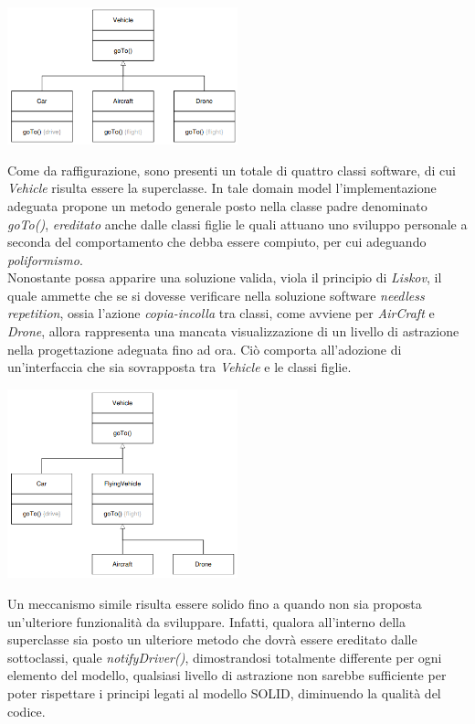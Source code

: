 \documentclass{article}
\begin{document}
\begin{center}
    \includegraphics*[width=0.5\textwidth]{foto 1.png}
\end{center}\vspace*{7pt}
Come da raffigurazione, sono presenti un totale di quattro classi software, di cui \textit{Vehicle} risulta essere la superclasse. In tale domain model l'implementazione adeguata propone un metodo generale posto nella classe padre denominato \textit{goTo()}, \textit{ereditato} anche dalle classi figlie le quali attuano uno sviluppo personale a seconda del comportamento che debba essere compiuto, per cui adeguando \textit{poliformismo}.\vspace*{7pt}\\
Nonostante possa apparire una soluzione valida, viola il principio di \textit{Liskov}, il quale ammette che se si dovesse verificare nella soluzione software \textit{needless repetition}, ossia l'azione \textit{copia-incolla} tra classi, come avviene per \textit{AirCraft} e \textit{Drone}, allora rappresenta una mancata visualizzazione di un livello di astrazione nella progettazione adeguata fino ad ora. Ciò comporta all'adozione di un'interfaccia che sia sovrapposta tra \textit{Vehicle} e le classi figlie. 
\begin{center}
    \includegraphics*[width=0.5\textwidth]{foto 2.png}
\end{center}
Un meccanismo simile risulta essere solido fino a quando non sia proposta un'ulteriore funzionalità da sviluppare. Infatti, qualora all'interno della superclasse sia posto un ulteriore metodo che dovrà essere ereditato dalle sottoclassi, quale \textit{notifyDriver()}, dimostrandosi totalmente differente per ogni elemento del modello, qualsiasi livello di astrazione non sarebbe sufficiente per poter rispettare i principi legati al modello SOLID, diminuendo la qualità del codice.
\end{document}
